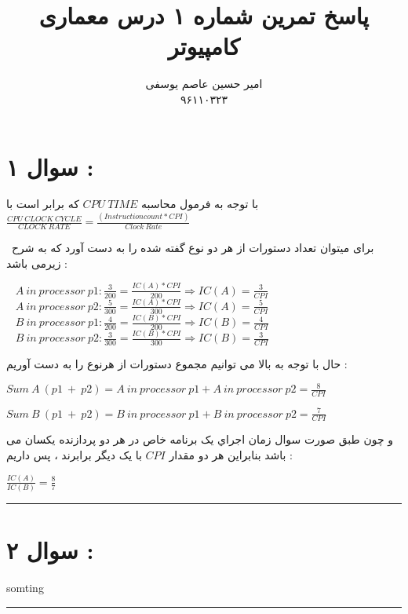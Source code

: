 \documentclass{article}
\title{پاسخ تمرین شماره ۱ درس معماری کامپیوتر}
\author{امیر حسین عاصم یوسفی \\ ۹۶۱۱۰۳۲۳}
\begin{document}
  \maketitle
  \section*{ سوال ۱  : }
  با توجه به فرمول محاسبه 
  $CPU  \ TIME$
  که برابر است با 
  $ \frac{CPU \  CLOCK \  CYCLE}{ CLOCK \  RATE} = \frac{(Instruction count *CPI)}{Clock  \  Rate}$
  
  برای میتوان تعداد دستورات از هر دو نوع گفته شده را به دست آورد که به شرح زیرمی باشد  : 
  \begin{center}
  	$A  \ in  \ processor  \  p1 : \frac{3}{200} = \frac{IC(A) * CPI}{200} \Rightarrow IC(A) = \frac{3}{CPI} $\\
  	$A  \ in  \ processor  \  p2 : \frac{5}{300} = \frac{IC(A) * CPI}{300} \Rightarrow IC(A) = \frac{5}{CPI} $\\
  	$ B  \ in  \ processor  \  p1 : \frac{4}{200} = \frac{IC(B) * CPI}{200} \Rightarrow IC(B) = \frac{4}{CPI}$\\
  	$ B  \ in  \ processor  \  p2 : \frac{3}{300} = \frac{IC(B) * CPI}{300} \Rightarrow IC(B) = \frac{3}{CPI}$
  \end{center}
حال با توجه به بالا  می توانیم مجموع دستورات از هرنوع را به دست آوریم  : 
 \begin{center}
 	$Sum \ A \  (p1 \  + \  p2)  = A  \ in  \ processor  \  p1 + A  \ in  \ processor  \  p2 = \frac{8}{CPI}$
 	
 \end{center}
\begin{center}
	$ Sum \ B \  (p1 \  + \  p2)  = B  \ in  \ processor  \  p1 + B  \ in  \ processor  \  p2 = \frac{7}{CPI}$
\end{center}
و چون طبق صورت سوال زمان اجراي یک برنامه خاص در هر دو پردازنده یکسان می باشد بنابراین هر دو مقدار 
$CPI$
با یک دیگر برابرند ، پس داریم : 
\begin{center}
	$  \frac{IC(A)}{IC(B)} = \frac{8}{7}$
\end{center}
\hrule
\section*{سوال ۲ : }
somting
\hrule
\end{document}
